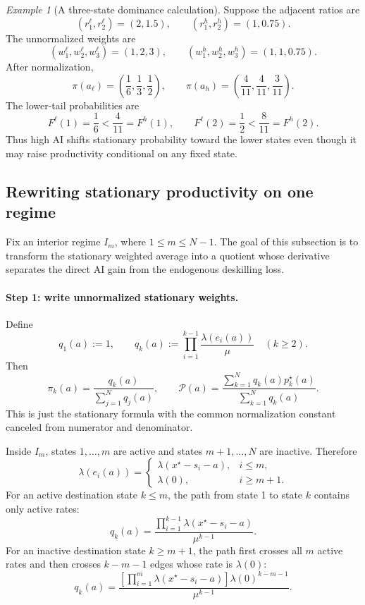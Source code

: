 \documentclass[11pt]{article}
\theoremstyle{tutorial}
\theoremstyle{remark}
\newtheorem{example}[theorem]{Example}
\newcommand{\1}{\mathbb{I}}
\newcommand{\calP}{\mathcal{P}}
\begin{document}
\begin{example}[A three-state dominance calculation]
Suppose the adjacent ratios are
\[
(r_1^\ell,r_2^\ell)=(2,1.5),
\qquad
(r_1^h,r_2^h)=(1,0.75).
\]
The unnormalized weights are
\[
(w_1^\ell,w_2^\ell,w_3^\ell)=(1,2,3),
\qquad
(w_1^h,w_2^h,w_3^h)=(1,1,0.75).
\]
After normalization,
\[
\pi(a_\ell)=\left(\frac16,\frac13,\frac12\right),
\qquad
\pi(a_h)=\left(\frac4{11},\frac4{11},\frac3{11}\right).
\]
The lower-tail probabilities are
\[
F^\ell(1)=\frac16<\frac4{11}=F^h(1),
\qquad
F^\ell(2)=\frac12<\frac8{11}=F^h(2).
\]
Thus high AI shifts stationary probability toward the lower states even though it may raise productivity
conditional on any fixed state.
\end{example}

\subsection{Rewriting stationary productivity on one regime}

Fix an interior regime $I_m$, where $1\le m\le N-1$.  The goal of this subsection is to transform the
stationary weighted average into a quotient whose derivative separates the direct AI gain from the
endogenous deskilling loss.

\paragraph{Step 1: write unnormalized stationary weights.}
Define
\[
  q_1(a):=1,
  \qquad
  q_k(a):=\prod_{i=1}^{k-1}\frac{\lambda(e_i(a))}{\mu}
  \quad(k\ge2).
\]
Then
\[
  \pi_k(a)=\frac{q_k(a)}{\sum_{j=1}^Nq_j(a)},
  \qquad
  \calP(a)=
  \frac{\sum_{k=1}^Nq_k(a)p_k^\star(a)}
       {\sum_{k=1}^Nq_k(a)}.
\]
This is just the stationary formula with the common normalization constant canceled from numerator and
denominator.

Inside $I_m$, states $1,\ldots,m$ are active and states $m+1,\ldots,N$ are inactive.  Therefore
\[
  \lambda(e_i(a))=
  \begin{cases}
  \lambda(x^\star-s_i-a),&i\le m,\\
  \lambda(0),&i\ge m+1.
  \end{cases}
\]
For an active destination state $k\le m$, the path from state 1 to state $k$ contains only active rates:
\[
  q_k(a)=\frac{\prod_{i=1}^{k-1}\lambda(x^\star-s_i-a)}{\mu^{k-1}}.
\]
For an inactive destination state $k\ge m+1$, the path first crosses all $m$ active rates and then crosses
$k-m-1$ edges whose rate is $\lambda(0)$:
\[
  q_k(a)=
  \frac{\left[\prod_{i=1}^{m}\lambda(x^\star-s_i-a)\right]
  \lambda(0)^{k-m-1}}{\mu^{k-1}}.
\]
\end{document}
